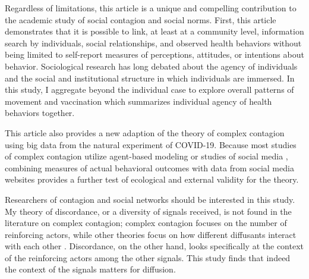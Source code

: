 Regardless of limitations, this article is a unique and compelling contribution
to the academic study of social contagion and social norms. First, this article
demonstrates that it is possible to link, at least at a community level,
information search by individuals, social relationships, and observed health
behaviors without being limited to self-report measures of perceptions,
attitudes, or intentions about behavior. Sociological research has long debated
about the agency of individuals and the social and institutional structure in
which individuals are immersed. In this study, I aggregate beyond the individual
case to explore overall patterns of movement and vaccination which summarizes
individual agency of health behaviors together.

This article also provides a new adaption of the theory of complex contagion
using big data from the natural experiment of COVID-19. Because most studies of
complex contagion utilize agent-based modeling or studies of social media \citep{aralExerciseContagionGlobal2017,sprague_house17,bond_etal12,latane_etal94}, combining measures of actual behavioral outcomes with data from
social media websites provides a further test of ecological and external
validity for the theory.

Researchers of contagion and social networks should be interested in this study.
My theory of discordance, or a diversity of signals received, is not found in
the literature on complex contagion; complex contagion focuses on the number of
reinforcing actors, while other theories focus on how different diffusants
interact with each other \citep{houghton20,goldbergSocialContagionAssociative2018,mason_etal07}. Discordance, on the other hand, looks specifically at the context of the reinforcing actors among the other signals. This study finds that indeed the context of the signals matters for diffusion.